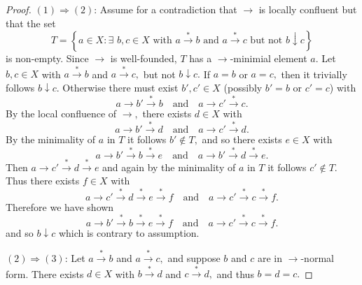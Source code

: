 \documentclass[
  letterpaper,
  10pt,
  reqno,
  twopage,
  openany]{book}
\theoremstyle{plain}
\theoremstyle{definition}
\theoremstyle{definition}
\theoremstyle{definition}
\theoremstyle{plain}
\theoremstyle{plain}
\theoremstyle{remark}
\begin{document}
\begin{proof}

\((1)\Rightarrow(2)\): Assume for a contradiction that
\(\longrightarrow\) is locally confluent but that the set \[
T=\left\{ a \in X  : \exists \, \, b, c \in X \text{ with } a \stackrel{*}{\longrightarrow} b \text{ and } a \stackrel{*}{\longrightarrow} c \text{ but not } b \downarrow c\right \}
\] is non-empty. Since \(\longrightarrow\) is well-founded, \(T\) has a
\(\longrightarrow\)-minimial element \(a.\) Let \(b,c \in X\) with
\(a \stackrel{*}{\longrightarrow} b\) and
\(a \stackrel{*}{\longrightarrow} c,\) but not \(b \downarrow c.\) If
\(a=b\) or \(a=c,\) then it trivially follows \(b \downarrow c.\)
Otherwise there must exist \(b', c'\in X\) (possibly \(b'=b\) or
\(c'=c\)) with \[
a \longrightarrow b' \stackrel{*}{\longrightarrow} b
\quad \text{and} \quad 
a \longrightarrow c' \stackrel{*}{\longrightarrow} c.
\] By the local confluence of \(\longrightarrow,\) there exists
\(d\in X\) with \[
a \longrightarrow b' \stackrel{*}{\longrightarrow} d
\quad \text{and} \quad 
a \longrightarrow c' \stackrel{*}{\longrightarrow} d.
\] By the minimality of \(a\) in \(T\) it follows \(b'\not\in T,\) and
so there exists \(e\in X\) with \[
a\longrightarrow b' \stackrel{*}{\longrightarrow} b \stackrel{*}{\longrightarrow} e
\quad \text{and} \quad 
a\longrightarrow b' \stackrel{*}{\longrightarrow} d \stackrel{*}{\longrightarrow} e.
\] Then
\(a\longrightarrow c' \stackrel{*}{\longrightarrow} d \stackrel{*}{\longrightarrow} e\)
and again by the minimality of \(a\) in \(T\) it follows
\(c'\not\in T.\) Thus there exists \(f \in X\) with \[
a \longrightarrow c' \stackrel{*}{\longrightarrow} d \stackrel{*}{\longrightarrow} e \stackrel{*}{\longrightarrow} f
\quad \text{and} \quad 
a \longrightarrow c' \stackrel{*}{\longrightarrow} c \stackrel{*}{\longrightarrow} f. 
\] Therefore we have shown \[
a \longrightarrow b' \stackrel{*}{\longrightarrow} b \stackrel{*}{\longrightarrow} e \stackrel{*}{\longrightarrow} f
\quad \text{and} \quad 
a \longrightarrow c' \stackrel{*}{\longrightarrow} c \stackrel{*}{\longrightarrow} f. 
\] and so \(b \downarrow c\) which is contrary to assumption.

\begin{figure}[h!tbp]
\centering
\end{figure}

\((2)\Rightarrow(3)\): Let \(a \stackrel{*}{\longrightarrow} b\) and
\(a \stackrel{*}{\longrightarrow} c,\) and suppose \(b\) and \(c\) are
in \(\longrightarrow\)-normal form. There exists \(d \in X\) with
\(b \stackrel{*}{\longrightarrow} d\) and
\(c \stackrel{*}{\longrightarrow} d,\) and thus \(b=d=c.\)


\end{proof}
\end{document}

